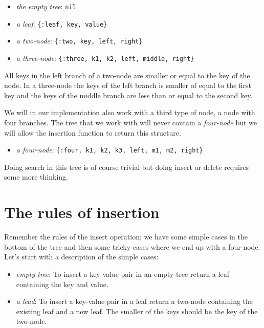 \documentclass[a4paper,11pt]{article}
\begin{document}
\begin{itemize}
    \item {\em the empty tree}: {\tt nil}
    \item {\em a leaf}: {\tt \{:leaf, key, value\}}
    \item {\em a two-node}: {\tt \{:two, key, left, right\}}
    \item {\em a three-node}: {\tt \{:three, k1, k2, left, middle, right\}}
\end{itemize}

All keys in the left branch of a two-node are smaller or equal to the
key of the node. In a three-node the keys of the left branch is
smaller of equal to the first key and the keys of the middle branch are
less than or equal to the second key.

We will in our implementation also work with a third type of node, a
node with four branches. The tree that we work with will never contain
a {\em four-node} but we will allow the insertion function to return
this structure.

\begin{itemize}
    \item {\em a four-node}: {\tt \{:four, k1, k2, k3, left, m1, m2, right\}}
\end{itemize}

Doing search in this tree is of course trivial but doing insert or
delete requires some more thinking.



\section{The rules of insertion}

Remember the rules of the insert operation; we have some simple cases
in the bottom of the tree and then some tricky cases where we end up
with a four-node. Let's start with a description of the simple cases:

\begin{itemize}
    \item {\em empty tree}: To insert a key-value pair in an empty tree return a leaf containing the key and value.
    \item {\em a lead}: To insert a key-value pair in a leaf return a
    two-node containing the existing leaf and a new leaf. The smaller
    of the keys should be the key of the two-node.
\end{itemize}
\end{document}
